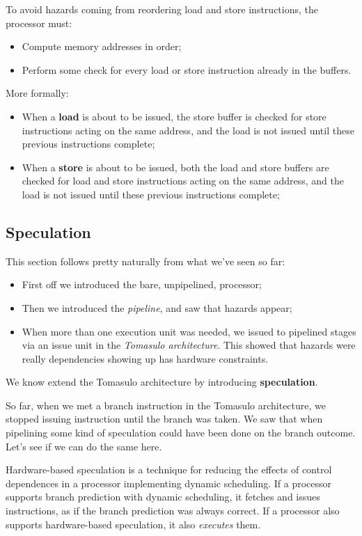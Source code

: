 \documentclass[a4paper,11pt]{article}
\begin{document}
To avoid hazards coming from reordering load
and store instructions, the processor must:
\begin{itemize}
	\item Compute memory addresses in order;
	\item Perform some check for every load or store
	      instruction already in the buffers.
\end{itemize}

More formally:
\begin{itemize}
	\item When a \textbf{load} is about to be issued, the store buffer is checked for store
	      instructions acting on the same address, and the load is not issued until these previous instructions complete;
	\item When a \textbf{store} is about to be issued, both the load and store buffers are checked for load and store
	      instructions acting on the same address, and the load is not issued until these previous instructions complete;
\end{itemize}

\subsection{Speculation}

This section follows pretty naturally from what we've seen so far:
\begin{itemize}
	\item First off we introduced the bare, unpipelined, processor;
	\item Then we introduced the \textit{pipeline}, and saw that hazards appear;
	\item When more than one execution unit was needed, we issued to pipelined stages via an issue unit in the \textit{Tomasulo architecture}. This showed that hazards were really dependencies showing up has hardware constraints.
\end{itemize}

We know extend the Tomasulo architecture by introducing \textbf{speculation}.

So far, when we met a branch instruction in the Tomasulo architecture, we stopped issuing instruction until the branch was taken.
We saw that when pipelining some kind of speculation could have been done on the branch outcome.
Let's see if we can do the same here.

Hardware-based speculation is a technique for
reducing the effects of control dependences in a
processor implementing dynamic scheduling.
If a processor supports branch prediction with
dynamic scheduling, it fetches and issues
instructions, as if the branch prediction was
always correct.
If a processor also supports hardware-based
speculation, it also \textit{executes} them.
\end{document}
